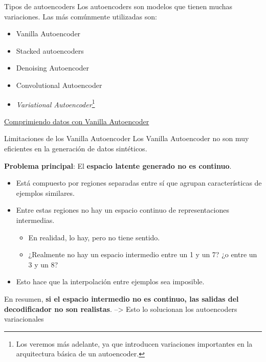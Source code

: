 \begin{frame}{Tipos de autoencoders}
Los autoencoders son modelos que tienen muchas variaciones. Las más comúnmente utilizadas son:

\begin{itemize}
    \item Vanilla Autoencoder
    \item Stacked autoencoders
    \item Denoising Autoencoder
    \item Convolutional Autoencoder
    \item \textit{Variational Autoencoder}\footnote{Los veremos más adelante, ya que introducen variaciones importantes en la arquitectura básica de un autoencoder.}
\end{itemize}
\end{frame}

\begin{exercise}
\href{https://colab.research.google.com/drive/1-YAytBp9L5nkHvAxKV7urjaeE6HH58Dj}{Comprimiendo datos con Vanilla Autoencoder}

\end{exercise}

\begin{frame}{Limitaciones de los Vanilla Autoencoder}
Los Vanilla Autoencoder no son muy eficientes en la generación de datos sintéticos.

\textbf{Problema principal}: El \textbf{espacio latente generado no es continuo}.

\begin{itemize}
    \item Está compuesto por regiones separadas entre sí que agrupan características de ejemplos similares.
    \item Entre estas regiones no hay un espacio continuo de representaciones intermedias.
    \begin{itemize}
        \item En realidad, lo hay, pero no tiene sentido.
        \item ¿Realmente no hay un espacio intermedio entre un 1 y un 7? ¿o entre un 3 y un 8?
    \end{itemize}
    \item Esto hace que la interpolación entre ejemplos sea imposible.
\end{itemize}

En resumen, \textbf{si el espacio intermedio no es continuo, las salidas del decodificador no son realistas}. --> Esto lo solucionan los autoencoders variacionales
\end{frame}

